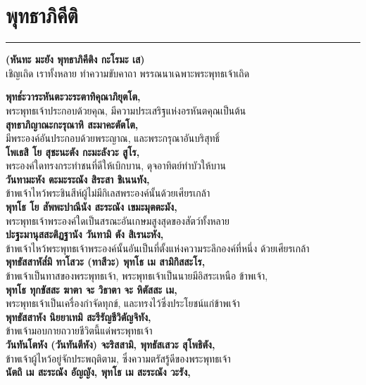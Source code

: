 \documentclass[12pt]{article}
\begin{document}
\section{พุทธาภิคีติ}
\hrule
\begin{center}
\textbf{(หันทะ มะยัง พุทธาภิคีติง กะโรมะ เส)}\\
เชิญเถิด เราทั้งหลาย ทำความขับคาถา พรรณนาเฉพาะพระพุทธเจ้าเถิด
\end{center}
\textbf{พุทธ๎ะวาระหันตะวะระตาทิคุณาภิยุตโต,}\\
\indent พระพุทธเจ้าประกอบด้วยคุณ, มีความประเสริฐแห่งอรหันตคุณเป็นต้น\\
\textbf{สุทธาภิญาณะกะรุณาหิ สะมาคะตัตโต,}\\
\indent มีพระองค์อันประกอบด้วยพระญาณ, และพระกรุณาอันบริสุทธิ์\\
\textbf{โพเธสิ โย สุชะนะตัง กะมะลังวะ สูโร,}\\
\indent พระองค์ใดทรงกระทำชนที่ดีให้เบิกบาน, ดุจอาทิตย์ทำบัวให้บาน\\
\textbf{วันทามะหัง ตะมะระณัง สิระสา ชิเนนทัง,}\\
\indent ข้าพเจ้าไหว้พระชินสีห์ผู้ไม่มีกิเลสพระองค์นั้นด้วยเศียรเกล้า\\
\textbf{พุทโธ โย สัพพะปาณีนัง สะระณัง เขมะมุตตะมัง,}\\
\indent พระพุทธเจ้าพระองค์ใดเป็นสรณะอันเกษมสูงสุดของสัตว์ทั้งหลาย\\
\textbf{ปะฐะมานุสสะติฏฐานัง วันทามิ ตัง สิเรนะหัง,}\\
\indent ข้าพเจ้าไหว้พระพุทธเจ้าพระองค์นั้นอันเป็นที่ตั้งแห่งความระลึกองค์ที่หนึ่ง ด้วยเศียรเกล้า\\
\textbf{พุทธัสสาหัส๎มิ ทาโสวะ (ทาสีวะ) พุทโธ เม สามิกิสสะโร,}\\
\indent ข้าพเจ้าเป็นทาสของพระพุทธเจ้า, พระพุทธเจ้าเป็นนายมีอิสระเหนือ ข้าพเจ้า,\\
\textbf{พุทโธ ทุกขัสสะ ฆาตา จะ วิธาตา จะ หิตัสสะ เม,}\\
\indent พระพุทธเจ้าเป็นเครื่องกำจัดทุกข์, และทรงไว้ซึ่งประโยชน์แก่ข้าพเจ้า\\
\textbf{พุทธัสสาหัง นิยยาเทมิ สะรีรัญชีวิตัญจิทัง,}\\
\indent ข้าพเจ้ามอบกายถวายชีวิตนี้แด่พระพุทธเจ้า\\
\textbf{วันทันโตหัง (วันทันตีหัง) จะริสสามิ, พุทธัสเสวะ สุโพธิตัง,}\\
\indent ข้าพเจ้าผู้ไหว้อยู่จักประพฤติตาม, ซึ่งความตรัสรู้ดีของพระพุทธเจ้า\\
\textbf{นัตถิ เม สะระณัง อัญญัง, พุทโธ เม สะระณัง วะรัง,}\\
\end{document}

